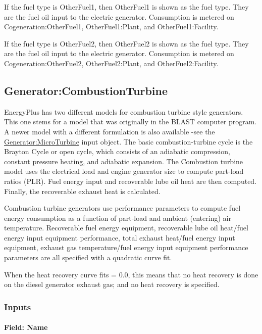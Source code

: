 If the fuel type is OtherFuel1, then OtherFuel1 is shown as the fuel type. They are the fuel oil input to the electric generator. Consumption is metered on Cogeneration:OtherFuel1, OtherFuel1:Plant, and OtherFuel1:Facility.

If the fuel type is OtherFuel2, then OtherFuel2 is shown as the fuel type. They are the fuel oil input to the electric generator. Consumption is metered on Cogeneration:OtherFuel2, OtherFuel2:Plant, and OtherFuel2:Facility.

\subsection{Generator:CombustionTurbine}\label{generatorcombustionturbine}

EnergyPlus has two different models for combustion turbine style generators. This one stems for a model that was originally in the BLAST computer program. A newer model with a different formulation is also available -see the \hyperref[generatormicroturbine]{Generator:MicroTurbine} input object. The basic combustion-turbine cycle is the Brayton Cycle or open cycle, which consists of an adiabatic compression, constant pressure heating, and adiabatic expansion. The Combustion turbine model uses the electrical load and engine generator size to compute part-load ratios (PLR). Fuel energy input and recoverable lube oil heat are then computed. Finally, the recoverable exhaust heat is calculated.

Combustion turbine generators use performance parameters to compute fuel energy consumption as a function of part-load and ambient (entering) air temperature. Recoverable fuel energy equipment, recoverable lube oil heat/fuel energy input equipment performance, total exhaust heat/fuel energy input equipment, exhaust gas temperature/fuel energy input equipment performance parameters are all specified with a quadratic curve fit.

When the heat recovery curve fits = 0.0, this means that no heat recovery is done on the diesel generator exhaust gas; and no heat recovery is specified.

\subsubsection{Inputs}\label{inputs-8-005}

\paragraph{Field: Name}\label{field-name-9-004}

